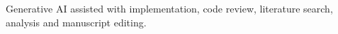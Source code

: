 Generative AI assisted with implementation, code review, literature search, analysis and manuscript editing.
